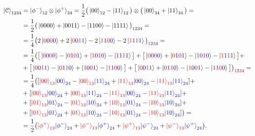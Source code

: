 \documentclass[a4paper,11pt]{article}
\newcommand{\rc}{\textcolor{red}}
\newcommand{\bc}{\textcolor{blue}}
\begin{document}
\begin{align}
\ket{\mathcal{C}}_{1234} &= \ket{\phi^-}_{12} \otimes \ket{\phi^+}_{34}
= \dfrac{1}{2} \big(\ket{00}_{12} - \ket{11}_{12} \big) \otimes \big( \ket{00}_{34} + \ket{11}_{34} \big) = \nonumber \\
&= \dfrac{1}{2} \big(\ket{0000} + \ket{0011} - \ket{1100} - \ket{1111}\big)_{1234} = \nonumber \\
&= \dfrac{1}{4} \big(2\ket{\rc{0}\bc{0}\rc{0}\bc{0}} + 2\ket{\rc{0}\bc{0}\rc{1}\bc{1}} - 2\ket{\rc{1}\bc{1}\rc{0}\bc{0}} - 2\ket{\rc{1}\bc{1}\rc{1}\bc{1}}\big)_{\rc{1}\bc{2}\rc{3}\bc{4}} = \nonumber \\
&= \dfrac{1}{4} \big(\big[\ket{\rc{0}\bc{0}\rc{0}\bc{0}} - \ket{\rc{0}\bc{1}\rc{0}\bc{1}} + \ket{\rc{1}\bc{0}\rc{1}\bc{0}} - \ket{\rc{1}\bc{1}\rc{1}\bc{1}} \big] +
\big[\ket{\rc{0}\bc{0}\rc{0}\bc{0}} + \ket{\rc{0}\bc{1}\rc{0}\bc{1}} - \ket{\rc{1}\bc{0}\rc{1}\bc{0}} - \ket{\rc{1}\bc{1}\rc{1}\bc{1}} \big] + \nonumber \\
&+\big[\ket{\rc{0}\bc{0}\rc{1}\bc{1}} - \ket{\rc{0}\bc{1}\rc{1}\bc{0}} + \ket{\rc{1}\bc{0}\rc{0}\bc{1}} - \ket{\rc{1}\bc{1}\rc{0}\bc{0}} \big] +
\big[\ket{\rc{0}\bc{0}\rc{1}\bc{1}} + \ket{\rc{0}\bc{1}\rc{1}\bc{0}} - \ket{\rc{1}\bc{0}\rc{0}\bc{1}} - \ket{\rc{1}\bc{1}\rc{0}\bc{0}} \big] \big)_{\rc{1}\bc{2}\rc{3}\bc{4}} = \nonumber \\
&= \dfrac{1}{4} \big([ \rc{\ket{00}_{13}} \bc{\ket{00}_{24}} - \rc{\ket{00}_{13}} \bc{\ket{11}_{24}} 
+ \rc{\ket{11}_{13}} \bc{\ket{00}_{24}} - \rc{\ket{11}_{13}} \bc{\ket{11}_{24}}] + \nonumber \\
&+ [\rc{\ket{00}_{13}} \bc{\ket{00}_{24}} + \rc{\ket{00}_{13}} \bc{\ket{11}_{24}} 
- \rc{\ket{11}_{13}} \bc{\ket{00}_{24}} - \rc{\ket{11}_{13}} \bc{\ket{11}_{24}}] + \nonumber \\
&+ [\rc{\ket{01}_{13}} \bc{\ket{01}_{24}} - \rc{\ket{01}_{13}} \bc{\ket{10}_{24}} 
+ \rc{\ket{10}_{13}} \bc{\ket{01}_{24}} - \rc{\ket{10}_{13}} \bc{\ket{10}_{24}}] + \nonumber \\
&+ [\rc{\ket{01}_{13}} \bc{\ket{01}_{24}} + \rc{\ket{01}_{13}} \bc{\ket{10}_{24}} 
- \rc{\ket{10}_{13}} \bc{\ket{01}_{24}} - \rc{\ket{10}_{13}} \bc{\ket{10}_{24}}] \big) = \nonumber \\
&= \dfrac{1}{2} \big(\rc{\ket{\phi^+}_{13}} \bc{\ket{\phi^-}_{24}} + \rc{\ket{\phi^-}_{13}} \bc{\ket{\phi^+}_{24}} + \rc{\ket{\psi^+}_{13}} \bc{\ket{\psi^-}_{24}} + \rc{\ket{\psi^-}_{13}} \bc{\ket{\psi^+}_{24}} \big) \label{state1}. \\ \nonumber \\

\end{align}
\end{document}
